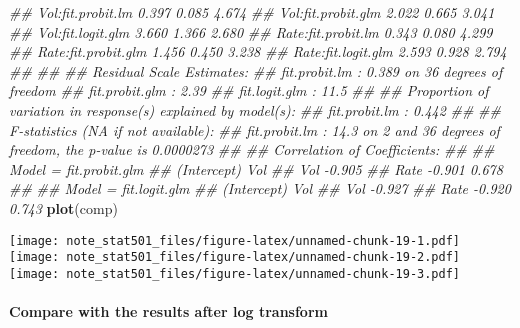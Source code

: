 \documentclass[
]{article}
\newenvironment{Shaded}{\begin{snugshade}}{\end{snugshade}}
\newcommand{\CommentTok}[1]{\textcolor[rgb]{0.56,0.35,0.01}{\textit{#1}}}
\newcommand{\KeywordTok}[1]{\textcolor[rgb]{0.13,0.29,0.53}{\textbf{#1}}}
\newcommand{\NormalTok}[1]{#1}
\begin{document}
\begin{Shaded}
\begin{Highlighting}[]
\CommentTok{## Vol:fit.probit.lm           0.397    0.085      4.674 }
\CommentTok{## Vol:fit.probit.glm          2.022    0.665      3.041 }
\CommentTok{## Vol:fit.logit.glm           3.660    1.366      2.680 }
\CommentTok{## Rate:fit.probit.lm          0.343    0.080      4.299 }
\CommentTok{## Rate:fit.probit.glm         1.456    0.450      3.238 }
\CommentTok{## Rate:fit.logit.glm          2.593    0.928      2.794 }
\CommentTok{## }
\CommentTok{## }
\CommentTok{## Residual Scale Estimates:}
\CommentTok{## fit.probit.lm  : 0.389 on 36 degrees of freedom}
\CommentTok{## fit.probit.glm : 2.39 }
\CommentTok{## fit.logit.glm  : 11.5 }
\CommentTok{## }
\CommentTok{## Proportion of variation in response(s) explained by model(s):}
\CommentTok{## fit.probit.lm  : 0.442 }
\CommentTok{## }
\CommentTok{## F-statistics (NA if not available):}
\CommentTok{## fit.probit.lm  : 14.3 on 2 and 36 degrees of freedom, the  p-value is 0.0000273 }
\CommentTok{## }
\CommentTok{## Correlation of Coefficients:}
\CommentTok{## }
\CommentTok{## Model =  fit.probit.glm }
\CommentTok{##      (Intercept) Vol   }
\CommentTok{## Vol  -0.905            }
\CommentTok{## Rate -0.901       0.678}
\CommentTok{## }
\CommentTok{## Model =  fit.logit.glm  }
\CommentTok{##      (Intercept) Vol   }
\CommentTok{## Vol  -0.927            }
\CommentTok{## Rate -0.920       0.743}
\KeywordTok{plot}\NormalTok{(comp)}
\end{Highlighting}
\end{Shaded}

\texttt{[image: note\_stat501\_files/figure-latex/unnamed-chunk-19-1.pdf]}
\texttt{[image: note\_stat501\_files/figure-latex/unnamed-chunk-19-2.pdf]}
\texttt{[image: note\_stat501\_files/figure-latex/unnamed-chunk-19-3.pdf]}

\hypertarget{compare-with-the-results-after-log-transform}{%
\paragraph{Compare with the results after log
transform}\label{compare-with-the-results-after-log-transform}}
\end{document}
